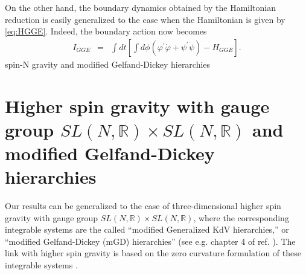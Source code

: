 \documentclass[letterpaper,11pt,oneside]{book}
\begin{document}
On the other hand, the boundary dynamics obtained by the Hamiltonian
reduction is easily generalized to the case when the Hamiltonian is
given by \eqref{eq:HGGE}. Indeed, the boundary action now becomes
\begin{eqnarray}
	I_{GGE} & = & \int dt\left[\int d\phi\left(\varphi^{\prime}\dot{\varphi}+\psi^{\prime}\dot{\psi}\right)-H_{GGE}\right].\label{eq:Total actionGGE}
\end{eqnarray}
spin-N gravity and modified Gelfand-Dickey hierarchies

\section{Higher spin gravity with gauge group $SL\left(N,\mathbb{R}\right)\times SL\left(N,\mathbb{R}\right)$
	and modified Gelfand-Dickey hierarchies\label{sec:Higher-spin-gravity SLN}}

Our results can be generalized to the case of three-dimensional higher
spin gravity with gauge group $SL\left(N,\mathbb{R}\right)\times SL\left(N,\mathbb{R}\right)$,
where the corresponding integrable systems are the called ``modified
Generalized KdV hierarchies,'' or ``modified Gelfand-Dickey (mGD)
hierarchies'' (see e.g. chapter 4 of ref. \cite{2003ASMP...26.....D}).
The link with higher spin gravity is based on the zero curvature formulation
of these integrable systems \cite{Drinfeld:1984qv}.
\end{document}
